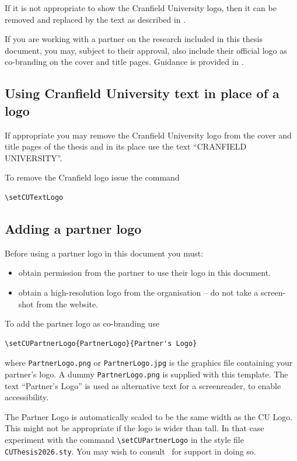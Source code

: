 \documentclass[12pt,oneside]{book} %
\begin{document}
If it is not appropriate to show the Cranfield University logo, then it can be removed and replaced by the text as described in .

If you are working with a partner on the research included in this thesis document, you may, subject to their approval, also include their official logo as co-branding on the cover and title pages. Guidance is provided in .



\subsection{Using Cranfield University text in place of a logo}
\label{sec:UseCUText}
If appropriate you may remove the Cranfield University logo from the cover and title pages of the thesis and in its place use the text “CRANFIELD UNIVERSITY”.

To remove the Cranfield logo issue the command
\begin{verbatim}
\setCUTextLogo
\end{verbatim}






\subsection{Adding a partner logo}
\label{sec:UsePartnerLogo}
Before using a partner logo in this document you must:
\begin{itemize}
\item obtain permission from the partner to use their logo in this document.
\item obtain a high-resolution logo from the organisation – do not take a screen-shot from the website.
\end{itemize}
To add the partner logo as co-branding use
\begin{verbatim}
\setCUPartnerLogo{PartnerLogo}{Partner's Logo}
\end{verbatim}
where \verb#PartnerLogo.png# or \verb#PartnerLogo.jpg# is the graphics file containing your partner's logo. A dummy \verb#PartnerLogo.png# is supplied with this template. The text ``Partner's Logo'' is used as alternative text for a screenreader, to enable accessibility.

The Partner Logo is automatically scaled to be the same width as the CU Logo. This might not be appropriate if the logo is wider than tall. In that case experiment with the command \verb#\setCUPartnerLogo# in the style file \verb#CUThesis2026.sty#. You may wish to consult~\cite{carlisleCTANPackageGraphicx2021,thelatexprojectteamCTANPackageArray2024} for support in doing so.
\end{document}
